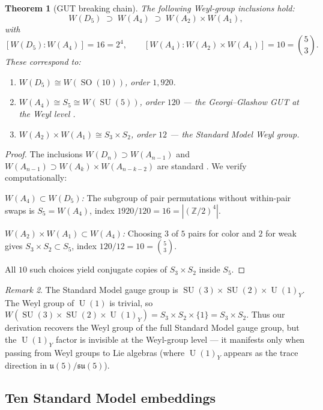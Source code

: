\documentclass[11pt,reqno]{amsart}
\theoremstyle{plain}
\newtheorem{theorem}{Theorem}[section]
\theoremstyle{definition}
\theoremstyle{remark}
\newtheorem{remark}[theorem]{Remark}
\newcommand{\Z}{\mathbb{Z}}
\DeclareMathOperator{\SO}{SO}
\DeclareMathOperator{\SU}{SU}
\DeclareMathOperator{\U}{U}
\begin{document}
\begin{theorem}[GUT breaking chain]\label{thm:gut}
The following Weyl-group inclusions hold:
\begin{equation}\label{eq:gutchain}
  W(D_5) \;\supset\; W(A_4) \;\supset\;
  W(A_2) \times W(A_1),
\end{equation}
with
\[
  [W(D_5) : W(A_4)] = 16 = 2^4,
  \qquad
  [W(A_4) : W(A_2)\times W(A_1)] = 10 = \binom{5}{3}.
\]
These correspond to:
\begin{enumerate}[label=(\roman*)]
\item $W(D_5) \cong W(\SO(10))$, order $1{,}920$.
\item $W(A_4) \cong S_5 \cong W(\SU(5))$, order $120$
  --- the Georgi--Glashow GUT at the Weyl level
  \cite{GeorgiGlashow1974}.
\item $W(A_2) \times W(A_1) \cong S_3 \times S_2$, order $12$
  --- the Standard Model Weyl group.
\end{enumerate}
\end{theorem}

\begin{proof}
The inclusions $W(D_n) \supset W(A_{n-1})$ and
$W(A_{n-1}) \supset W(A_k) \times W(A_{n-k-2})$ are standard
\cite{Humphreys1990,Bourbaki1968}.
We verify computationally:

\emph{$W(A_4) \subset W(D_5)$:}
The subgroup of pair permutations without within-pair swaps
is $S_5 = W(A_4)$, index
$1920/120 = 16 = |(\Z/2)^4|$.

\emph{$W(A_2)\times W(A_1) \subset W(A_4)$:}
Choosing $3$ of $5$ pairs for color and $2$ for weak gives
$S_3 \times S_2 \subset S_5$, index
$120/12 = 10 = \binom{5}{3}$.

All $10$ such choices yield conjugate copies of
$S_3 \times S_2$ inside $S_5$.
\end{proof}

\begin{remark}\label{rem:U1invisible}
The Standard Model gauge group is
$\SU(3) \times \SU(2) \times \U(1)_Y$.
The Weyl group of $\U(1)$ is trivial, so
$W(\SU(3) \times \SU(2) \times \U(1)_Y)
= S_3 \times S_2 \times \{1\} = S_3 \times S_2$.
Thus our derivation recovers the Weyl group of the full
Standard Model gauge group, but the $\U(1)_Y$ factor
is invisible at the Weyl-group level ---
it manifests only when passing from Weyl groups to
Lie algebras (where $\U(1)_Y$ appears as the trace
direction in $\mathfrak{u}(5)/\mathfrak{su}(5)$).
\end{remark}

\subsection{Ten Standard Model embeddings}
\end{document}
